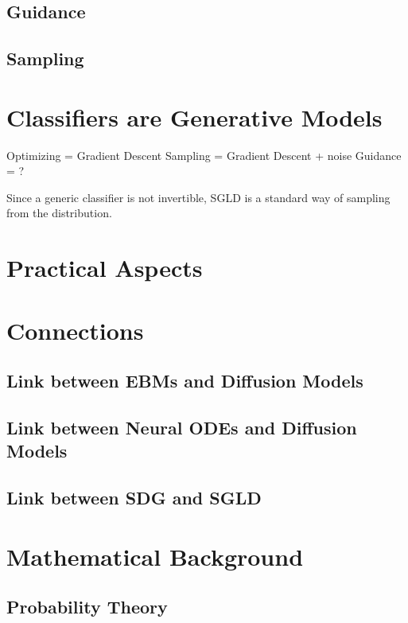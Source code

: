 \documentclass[a4paper, 11pt]{article}
\begin{document}
\subsection{Guidance}

\subsection{Sampling}


\section{Classifiers are Generative Models}

Optimizing = Gradient Descent
Sampling = Gradient Descent + noise
Guidance = ?

Since a generic classifier is not invertible, SGLD is a standard way of sampling from the distribution.

\section{Practical Aspects}

\section{Connections}
\subsection{Link between EBMs and Diffusion Models}
\subsection{Link between Neural ODEs and Diffusion Models}
\subsection{Link between SDG and SGLD}

\appendix
\section{Mathematical Background}
\subsection{Probability Theory}


 

\end{document}
